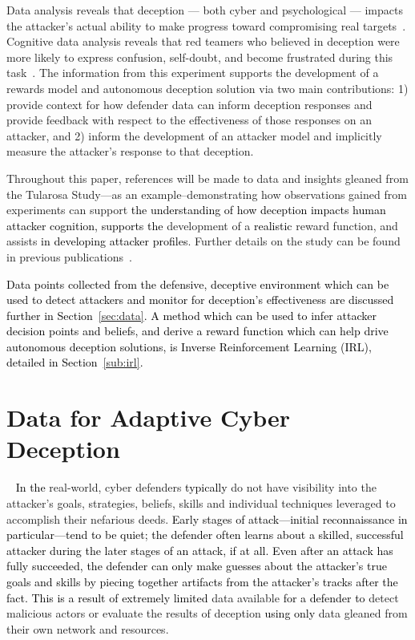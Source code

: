 \documentclass{article}
\newcommand\mmm[1]{\textcolor{black}{#1}}
\newcommand\kjf[1]{\textcolor{black}{#1}}
\newcommand\nnn[1]{\textcolor{black}{#1}}
\begin{document}
Data analysis reveals that deception --- both cyber and psychological --- impacts the attacker's actual ability to make progress toward compromising real targets~\cite{usenix-2021}. Cognitive data analysis reveals that red teamers who believed in deception were more likely to express confusion, self-doubt, and become frustrated during this task~\cite{fergusonwalter-thesis}. The information from this experiment supports the development of a rewards model and autonomous deception solution via two main contributions: 1) provide context for how defender data can inform deception responses and provide feedback with respect to the effectiveness of those responses on an attacker, and 2) inform the development of an attacker model and implicitly measure the attacker's response to that deception.

Throughout this paper, references will be made to data and insights gleaned from the Tularosa Study---as an example--demonstrating how observations gained from experiments can support \nnn{the understanding of how deception impacts human attacker cognition, supports the} development of a \kjf{realistic} reward function, and assists \nnn{in developing attacker profiles}. Further details on the study can be found in previous publications~\cite{ferguson-walter_HACS_2019}\cite{tularosa2019}\cite{tularosa_appendix}.

\nnn{Data points collected from the defensive, deceptive environment which can be used to detect attackers and monitor for deception's effectiveness are discussed further in Section~\ref{sec:data}. A method which can be used to infer attacker decision points and beliefs, and \kjf{derive a reward function} which can help drive autonomous deception solutions, is Inverse Reinforcement Learning (IRL), detailed in Section~\ref{sub:irl}.}


\section{Data for Adaptive Cyber Deception}~\label{sec:data}
\mmm{In the} real-world, cyber defenders \mmm{typically} do not have visibility into the attacker's goals, strategies, beliefs, skills and individual techniques leveraged to accomplish their nefarious deeds. \mmm{Early stages of attack---initial reconnaissance in particular---tend to be quiet; the defender often learns about a skilled, successful attacker during the later stages of an attack, if at all. Even \nnn{after} an attack has fully succeeded, the defender can only make guesses about the attacker's true goals and skills by piecing together artifacts from the attacker's tracks after the fact. This is a result of extremely limited} data available \mmm{for a defender to} detect malicious actors or evaluate the results of deception \kjf{using only} data gleaned from their own network and resources. 
\end{document}
